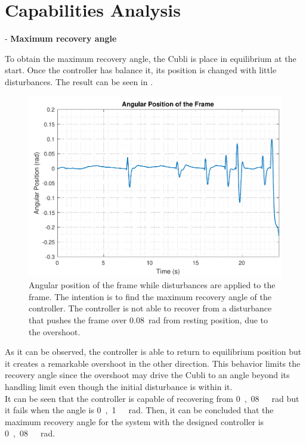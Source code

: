 \section{Capabilities Analysis}
- \textbf{Maximum recovery angle}

To obtain the maximum recovery angle, the Cubli is place in equilibrium at the start. Once the controller has balance it, its position is changed with little disturbances. The result can be seen in .

\begin{figure}[H]
	\centering
	\includegraphics[scale=0.50]{figures/testRecovery}
	\caption{Angular position of the frame while disturbances are applied to the frame. The intention is to find the maximum recovery angle of the controller. The controller is not able to recover from a disturbance that pushes the frame over \SI{0,08}{rad} from resting position, due to the overshoot.}
	\label{testRecovery}
\end{figure}\vspace{-18pt}
%
As it can be observed, the controller is able to return to equilibrium position but it creates a remarkable overshoot in the other direction. This behavior limits the recovery angle since the overshoot may drive the Cubli to an angle beyond its handling limit even though the initial disturbance is within it.\\
It can be seen that the controller is capable of recovering from \si{0,08\ rad} but it fails when the angle is \si{0,1\ rad}. Then, it can be concluded that the maximum recovery angle for the system with the designed controller is \si{0,08\ rad}.

